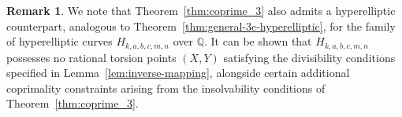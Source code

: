 \documentclass[11pt,a4paper]{amsart}
\newcommand{\Q}{\mathbb{Q}}
\theoremstyle{plain}
\theoremstyle{definition}
\newtheorem{remark}[theorem]{Remark}
\begin{document}
\begin{remark}\label{rem:hyperelliptic_counterpart}
We note that Theorem~\ref{thm:coprime_3} also admits a hyperelliptic counterpart, analogous to Theorem~\ref{thm:general-3c-hyperelliptic}, for the family of hyperelliptic curves $H_{k,a,b,c,m,n}$ over $\Q$. It can be shown that $H_{k,a,b,c,m,n}$ possesses no rational torsion points $(X,Y)$ satisfying the divisibility conditions specified in Lemma~\ref{lem:inverse-mapping}, alongside certain additional coprimality constraints arising from the insolvability conditions of Theorem~\ref{thm:coprime_3}.
\end{remark}



\end{document}
